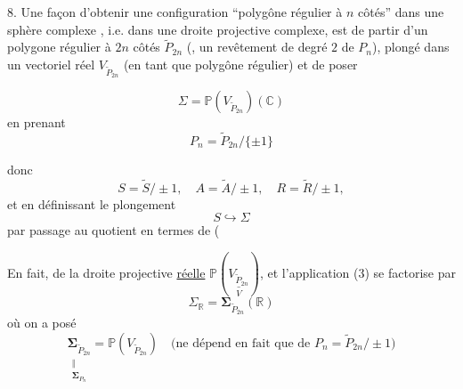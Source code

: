 8. Une façon d'obtenir une configuration ``polygône régulier à $n$ côtés''  dans une sphère complexe \inserted{$\Sigma$},  i.e. dans une droite projective complexe, est de partir d'un polygone régulier à $2n$ côtés $\widetilde P_{2n}$ (, un revêtement de degré $2$ de $P_n$), plongé dans un   vectoriel réel $V_{\widetilde P_{2n}}$ (en tant que polygône régulier) et de poser


\[
\tag{1}\Sigma=\mathbb P(V_{\widetilde P_{2n}})(\mathbb C)
\]
en prenant
\[
\tag{2}P_n=\widetilde P_{2n}/\{\pm1\}
\]

 donc
\[
S=\widetilde S/\pm1,\quad A=\widetilde A/\pm1,\quad R=\widetilde R/\pm1,
\]
et en définissant le plongement
\[
\tag{3}S\hookrightarrow\Sigma
\]
par passage au quotient en termes de
(

 En fait,   de la droite projective \uline{réelle} $\mathbb P(\underset{V}{\underline{V_{\widetilde P_{2n}}}})$, et l'application (3) se factorise par 
\[
\tag{4}\Sigma_{\mathbb R}=\boldsymbol\Sigma_{\widetilde P_{2n}}(\mathbb R)
\]
où on a posé
\[
\tag{5}
\underset{\substack{\Vert\\\boldsymbol\Sigma_{P_n}}}{\boldsymbol\Sigma_{\widetilde P_{2n}}}
=\mathbb P(V_{\widetilde P_{2n}})
\quad\text{(ne dépend en fait que de }P_n=\widetilde P_{2n}/\pm1\text{)}
\]


